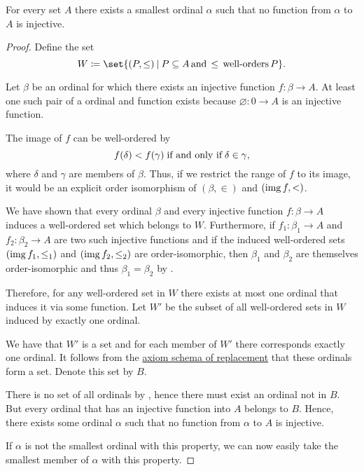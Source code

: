 \begin{theorem}\label{thm:hartogs_lemma}
  For every set \( A \) there exists a smallest ordinal \( \alpha \) such that no function from \( \alpha \) to \( A \) is injective.
\end{theorem}
\begin{proof}
  Define the set
  \begin{equation*}
    W \coloneqq \set{ (P, \leq) \given P \subseteq A \T*{and} \leq \T*{well-orders} P }.
  \end{equation*}

  Let \( \beta \) be an ordinal for which there exists an injective function \( f: \beta \to A \). At least one such pair of a ordinal and function exists because \( \varnothing: 0 \to A \) is an injective function.

  The image of \( f \) can be well-ordered by
  \begin{equation*}
    f(\delta) < f(\gamma) \T{if and only if} \delta \in \gamma,
  \end{equation*}
  where \( \delta \) and \( \gamma \) are members of \( \beta \). Thus, if we restrict the range of \( f \) to its image, it would be an explicit order isomorphism of \( (\beta, \in) \) and \( (\operatorname{img} f, <) \).

  We have shown that every ordinal \( \beta \) and every injective function \( f: \beta \to A \) induces a well-ordered set which belongs to \( W \). Furthermore, if \( f_1: \beta_1 \to A \) and \( f_2: \beta_2 \to A \) are two such injective functions and if the induced well-ordered sets \( (\operatorname{img} f_1, \leq_1) \) and \( (\operatorname{img} f_2, \leq_2) \) are order-isomorphic, then \( \beta_1 \) and \( \beta_2 \) are themselves order-isomorphic and thus \( \beta_1 = \beta_2 \) by .

  Therefore, for any well-ordered set in \( W \) there exists at most one ordinal that induces it via some function. Let \( W' \) be the subset of all well-ordered sets in \( W \) induced by exactly one ordinal.

  We have that \( W' \) is a set and for each member of \( W' \) there corresponds exactly one ordinal. It follows from the \hyperref[def:zfc/replacement]{axiom schema of replacement} that these ordinals form a set. Denote this set by \( B \).

  There is no set of all ordinals by , hence there must exist an ordinal not in \( B \). But every ordinal that has an injective function into \( A \) belongs to \( B \). Hence, there exists some ordinal \( \alpha \) such that no function from \( \alpha \) to \( A \) is injective.

  If \( \alpha \) is not the smallest ordinal with this property, we can now easily take the smallest member of \( \alpha \) with this property.
\end{proof}

